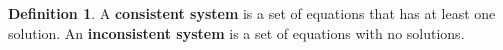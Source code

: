 \documentclass{report}
\theoremstyle{definition}
\newtheorem{definition}{\bf Definition}[section]
\begin{document}
%
%
%


\noindent\large{}


\newpage


\begin{definition}
A \textbf{consistent system} is a set of equations that has at least one solution. An \textbf{inconsistent system} is a set of equations with no solutions.
\end{definition}
\end{document}
